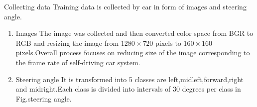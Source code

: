 \documentclass{beamer}
\begin{document}
\begin{frame}
\begin{block}{Collecting data}
Training data is collected by car in form of images and steering angle.
\begin{enumerate}
    \item Images 
\newline 
  The image was collected and then converted color space from BGR to RGB and resizing the image from $1280\times 720$ pixels to $160\times 160$ pixels.Overall process focuses on reducing size of the image corresponding to the frame rate of self-driving car system.
\newline
\item Steering angle
\newline
It is transformed into 5 classes are left,midleft,forward,right and midright.Each class is divided into intervals of 30 degrees per class in Fig.steering angle.
\end{enumerate}
\end{block}
    
\end{frame}
\end{document}
